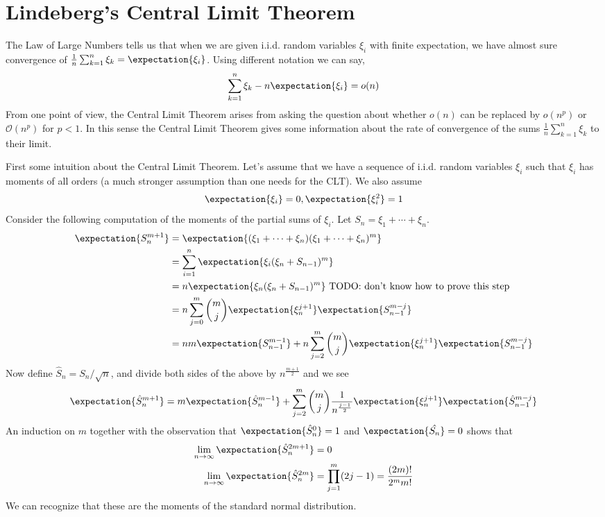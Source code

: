 \chapter{Lindeberg's Central Limit Theorem}

The Law of Large Numbers tells us that when we are given i.i.d. random
variables $\xi_i$ with finite expectation, we have almost sure
convergence of $\frac{1}{n} \sum_{k=1}^n \xi_k =
\expectation{\xi_i}$.  Using different notation we can say, 
\begin{align*}
\sum_{k=1}^n \xi_k - n \expectation{\xi_i}  = o(n)
\end{align*}
From one point of view, the Central Limit Theorem arises from asking
the question about whether $o(n)$ can be replaced by $o(n^p)$ or
$\mathcal{O}(n^p)$ for $p < 1$.  In this sense the Central Limit
Theorem gives some information about the rate of convergence of the sums
$\frac{1}{n} \sum_{k=1}^n \xi_k$ to their limit.

First some intuition about the Central Limit Theorem.  Let's assume
that we have a sequence of i.i.d. random variables $\xi_i$ such that
$\xi_i$ has moments of all orders (a much stronger assumption than one
needs for the CLT).  We also assume 
\begin{align*}
\expectation{\xi_i} = 0, \expectation{\xi_i^2} =1
\end{align*}
Consider the following computation of the moments
of the partial sums of $\xi_i$.  Let $S_n = \xi_1 + \cdots + \xi_n$.
\begin{align*}
\expectation{S_n^{m+1}} &= \expectation{(\xi_1
  + \cdots + \xi_n) (\xi_1
  + \cdots + \xi_n)^{m}} \\
&= \sum_{i=1}^n \expectation{\xi_i (\xi_n + S_{n-1})^m }\\
&= n \expectation{\xi_n (\xi_n + S_{n-1})^m} \textrm{ TODO: don't know how
  to prove this step}\\
&= n \sum_{j=0}^m \binom{m}{j} \expectation{\xi_n^{j+1}}
\expectation{S_{n-1}^{m-j}} \\
&= n m \expectation{S_{n-1}^{m-1}} + n \sum_{j=2}^m \binom{m}{j} \expectation{\xi_n^{j+1}}
\expectation{S_{n-1}^{m-j}} \\
\end{align*}
Now define $\hat{S}_n = S_n/\sqrt{n}$, and divide both sides of the
above by $n^{\frac{m+1}{2}}$ and we see
\begin{align*}
\expectation{\hat{S}_n^{m+1}} = m \expectation{\hat{S}_n^{m-1}} + \sum_{j=2}^m \binom{m}{j} \frac{1}{n^\frac{j-1}{2}}\expectation{\xi_n^{j+1}}
\expectation{\hat{S}_{n-1}^{m-j}}
\end{align*}
An induction on $m$ together with the observation that $\expectation{\hat{S}_n^0} =
1$ and $\expectation{\hat{S_n}} = 0$ shows that 
\begin{align*}
\lim_{n \to \infty} \expectation{\hat{S}_n^{2m+1}}&=0 \\
\lim_{n \to \infty} \expectation{\hat{S}_n^{2m}}&=\prod_{j=1}^m (2j-1)
= \frac{(2m)!}{2^m m!}\\
\end{align*}
We can recognize that these are the moments of the standard normal
distribution.

